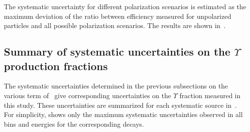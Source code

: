 



The systematic uncertainty for different polarization scenarios is estimated
as the maximum deviation of the ratio between efficiency measured for unpolarized
particles and all possible polarization scenarios. The results  are
shown in~.



\subsection{Summary of systematic uncertainties on the $\Upsilon$ production fractions} 
The systematic uncertainties determined in
the previous subsections on the various term of~ give
corresponding uncertainties on the $\Upsilon$ fraction measured in this
study. These uncertainties are summarized for each systematic source
in~. For simplicity,
 shows only the maximum systematic uncertainties observed  
in all bins and energies for the corresponding decays.



% 


